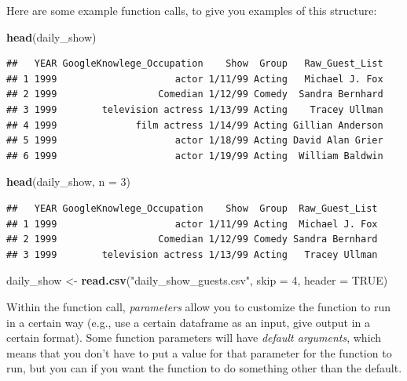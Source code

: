 \documentclass[]{book}
\makeatletter
\newenvironment{Shaded}{\begin{snugshade}}{\end{snugshade}}
\newcommand{\KeywordTok}[1]{\textcolor[rgb]{0.13,0.29,0.53}{\textbf{#1}}}
\newcommand{\DataTypeTok}[1]{\textcolor[rgb]{0.13,0.29,0.53}{#1}}
\newcommand{\DecValTok}[1]{\textcolor[rgb]{0.00,0.00,0.81}{#1}}
\newcommand{\StringTok}[1]{\textcolor[rgb]{0.31,0.60,0.02}{#1}}
\newcommand{\OtherTok}[1]{\textcolor[rgb]{0.56,0.35,0.01}{#1}}
\newcommand{\NormalTok}[1]{#1}
\newenvironment{kframe}{%
\medskip{}
\setlength{\fboxsep}{.8em}
 \def\at@end@of@kframe{}%
 \ifinner\ifhmode%
  \def\at@end@of@kframe{\end{minipage}}%
  \begin{minipage}{\columnwidth}%
 \fi\fi%
 \def\FrameCommand##1{\hskip\@totalleftmargin \hskip-\fboxsep
 \colorbox{shadecolor}{##1}\hskip-\fboxsep
     \hskip-\linewidth \hskip-\@totalleftmargin \hskip\columnwidth}%
 \MakeFramed {\advance\hsize-\width
   \@totalleftmargin\z@ \linewidth\hsize
   \@setminipage}}%
 {\par\unskip\endMakeFramed%
 \at@end@of@kframe}
\renewenvironment{Shaded}{\begin{kframe}}{\end{kframe}}
\theoremstyle{definition}
\theoremstyle{definition}
\theoremstyle{definition}
\theoremstyle{remark}
\makeatother
\begin{document}
Here are some example function calls, to give you examples of this
structure:

\begin{Shaded}
\begin{Highlighting}[]
\KeywordTok{head}\NormalTok{(daily_show)}
\end{Highlighting}
\end{Shaded}

\begin{verbatim}
##   YEAR GoogleKnowlege_Occupation    Show  Group   Raw_Guest_List
## 1 1999                     actor 1/11/99 Acting   Michael J. Fox
## 2 1999                  Comedian 1/12/99 Comedy  Sandra Bernhard
## 3 1999        television actress 1/13/99 Acting    Tracey Ullman
## 4 1999              film actress 1/14/99 Acting Gillian Anderson
## 5 1999                     actor 1/18/99 Acting David Alan Grier
## 6 1999                     actor 1/19/99 Acting  William Baldwin
\end{verbatim}

\begin{Shaded}
\begin{Highlighting}[]
\KeywordTok{head}\NormalTok{(daily_show, }\DataTypeTok{n =} \DecValTok{3}\NormalTok{)}
\end{Highlighting}
\end{Shaded}

\begin{verbatim}
##   YEAR GoogleKnowlege_Occupation    Show  Group  Raw_Guest_List
## 1 1999                     actor 1/11/99 Acting  Michael J. Fox
## 2 1999                  Comedian 1/12/99 Comedy Sandra Bernhard
## 3 1999        television actress 1/13/99 Acting   Tracey Ullman
\end{verbatim}

\begin{Shaded}
\begin{Highlighting}[]
\NormalTok{daily_show <-}\StringTok{ }\KeywordTok{read.csv}\NormalTok{(}\StringTok{"daily_show_guests.csv"}\NormalTok{,}
                    \DataTypeTok{skip =} \DecValTok{4}\NormalTok{,}
                    \DataTypeTok{header =} \OtherTok{TRUE}\NormalTok{)}
\end{Highlighting}
\end{Shaded}

Within the function call, \emph{parameters} allow you to customize the
function to run in a certain way (e.g., use a certain dataframe as an
input, give output in a certain format). Some function parameters will
have \emph{default arguments}, which means that you don't have to put a
value for that parameter for the function to run, but you can if you
want the function to do something other than the default.
\end{document}
